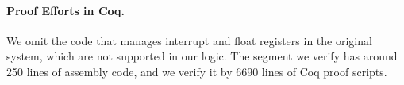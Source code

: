 \paragraph{\textbf{Proof Efforts in Coq.}}
We omit the code that manages interrupt
and float registers in the original
system, which are not supported in our logic.
The segment we verify has around 250 lines
of assembly code,
and we verify it by 6690 lines of %
Coq proof scripts.

